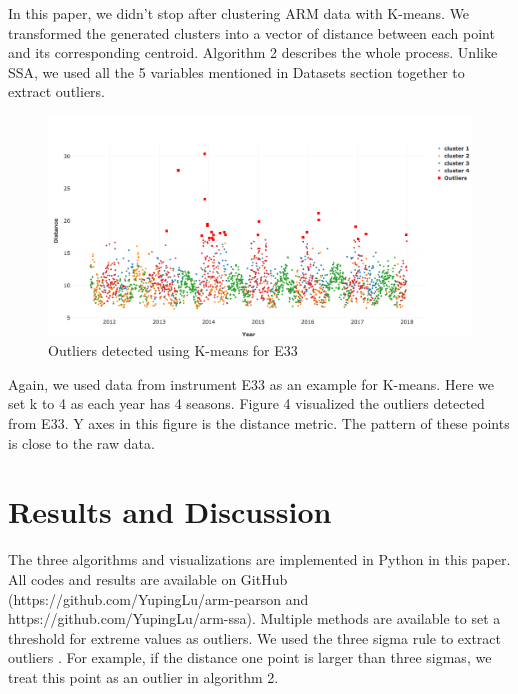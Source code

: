 \documentclass[letterpaper, 10 pt, conference]{ieeeconf}  %
\begin{document}
In this paper, we didn't stop after clustering ARM data with K-means. We transformed the generated clusters into a vector of distance between each point and its corresponding centroid. Algorithm 2 describes the whole process. Unlike SSA, we used all the 5 variables mentioned in Datasets section together to extract outliers.

\begin{figure}[ht]
    \centering
    \includegraphics[width=\textwidth]{kmeans.png}
    \caption{Outliers detected using K-means for E33}
    \label{fig:kmeans}
\end{figure}

Again, we used data from instrument E33 as an example for K-means. Here we set k to 4 as each year has 4 seasons.  Figure 4 visualized the outliers detected from E33. Y axes in this figure is the distance metric. The pattern of these points is close to the raw data.

\section{Results and Discussion}
The three algorithms and visualizations are implemented in Python in this paper. All codes and results are available on GitHub (https://github.com/YupingLu/arm-pearson and https://github.com/YupingLu/arm-ssa). Multiple methods are available to set a threshold for extreme values as outliers. We used the three sigma rule to extract outliers \cite{pukelsheim1994three}. For example, if the distance one point is larger than three sigmas, we treat this point as an outlier in algorithm 2.
\end{document}
